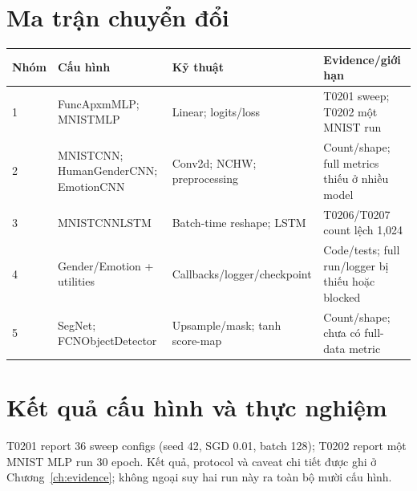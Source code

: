 \section{Ma trận chuyển đổi}
\begin{longtable}{p{}p{}p{}p{}}
\toprule Nhóm & Cấu hình & Kỹ thuật & Evidence/giới hạn \\
\midrule
1 & FuncApxmMLP; MNISTMLP & Linear; logits/loss & T0201 sweep; T0202 một MNIST run \\
2 & MNISTCNN; HumanGenderCNN; EmotionCNN & Conv2d; NCHW; preprocessing & Count/shape; full metrics thiếu ở nhiều model \\
3 & MNISTCNNLSTM & Batch-time reshape; LSTM & T0206/T0207 count lệch 1,024 \\
4 & Gender/Emotion + utilities & Callbacks/logger/checkpoint & Code/tests; full run/logger bị thiếu hoặc blocked \\
5 & SegNet; FCNObjectDetector & Upsample/mask; tanh score-map & Count/shape; chưa có full-data metric \\
\bottomrule
\end{longtable}

\section{Kết quả cấu hình và thực nghiệm}
T0201 report 36 sweep configs (seed 42, SGD 0.01, batch 128); T0202 report một MNIST MLP run 30 epoch. Kết quả, protocol và caveat chi tiết được ghi ở Chương~\ref{ch:evidence}; không ngoại suy hai run này ra toàn bộ mười cấu hình.